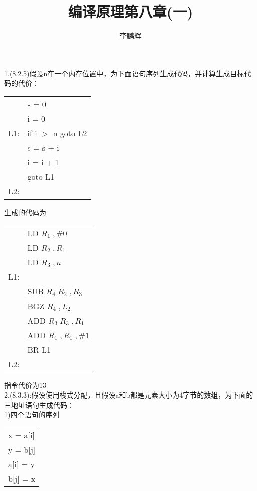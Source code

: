 \documentclass[a4paper, 16pt]{article}
\title{编译原理第八章(一)}
\author{李鹏辉}
\begin{document}
\maketitle

1.(8.2.5)假设n在一个内存位置中，为下面语句序列生成代码，并计算生成目标代码的代价：
\begin{table}[H]
\centering
\begin{tabular}{l l}
& s = 0\\
& i = 0 \\
L1: & if i $>$ n goto L2\\
& s = s + i\\
& i = i + 1\\
& goto L1\\
L2: &\\
\end{tabular}
\end{table}

生成的代码为
\begin{table}[H]
\centering
\begin{tabular}{l l}
& LD $R_1\;, \#0$ \\
& LD $R_2\;, R_1$ \\
& LD $R_3\;,n$\\
L1: &\\
&SUB $R_4\; R_2\;,R_3$\\
&BGZ $R_4\;, L_2$\\
&ADD $R_3\; R_3\;, R_1$\\
&ADD $R_1\;, R_1\;, \#1$\\
&BR L1\\
L2: &\\
\end{tabular}
\end{table}
指令代价为13\\

2.(8.3.3):假设使用栈式分配，且假设a和b都是元素大小为4字节的数组，为下面的三地址语句生成代码：\\
1)四个语句的序列
\begin{table}[H]
\centering
\begin{tabular}{l}
x = a[i] \\
y = b[j] \\
a[i] = y\\
b[j] = x\\
\end{tabular}
\end{table}
\end{document}
